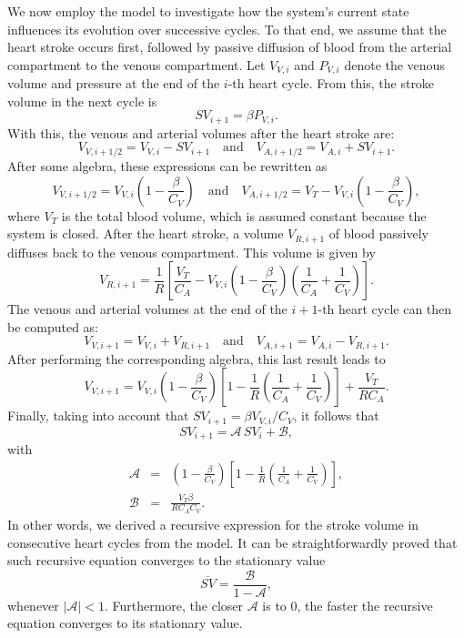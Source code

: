 \documentclass[%
preprint,
 amsmath,amssymb,
 aps,
]{revtex4-2}
\begin{document}
We now employ the \citeauthor{Upton_2005} model to investigate how the system's current state influences its evolution over successive cycles. To that end, we assume that the heart stroke occurs first, followed by passive diffusion of blood from the arterial compartment to the venous compartment. Let $V_{V,i}$ and $P_{V,i}$ denote the venous volume and pressure at the end of the $i$-th heart cycle. From this, the stroke volume in the next cycle is
\[
    SV_{i+1} = \beta P_{V,i}. 
\]
With this, the venous and arterial volumes after the heart stroke are:
\[
    V_{V, i+1/2} = V_{V, i} - SV_{i+1} \quad \text{and} \quad V_{A, i+1/2} = V_{A, i} + SV_{i+1}.
\]
After some algebra, these expressions can be rewritten as
\[
    V_{V, i+1/2} = V_{V,i} \left( 1 - \frac{\beta}{C_V} \right) \quad \text{and} \quad V_{A, i+1/2} = V_T - V_{V,i} \left( 1 - \frac{\beta}{C_V} \right),
\]
where $V_T$ is the total blood volume, which is assumed constant because the system is closed. After the heart stroke, a volume $V_{R, i+1}$ of blood passively diffuses back to the venous compartment. This volume is given by
\[
    V_{R, i+1} = \frac{1}{R}\left[ \frac{V_T}{C_A} - V_{V,i}\left(1-\frac{\beta}{C_V}\right)\left(\frac{1}{C_A} + \frac{1}{C_V}\right)\right].
\]
The venous and arterial volumes at the end of the $i+1$-th heart cycle can then be computed as:
\[
    V_{V, i+1} = V_{V,i} + V_{R, i+1} \quad \text{and} \quad V_{A, i+1} = V_{A,i} - V_{R, i+1}.
\] 
After performing the corresponding algebra, this last result leads to
\[
    V_{V, i+1} = V_{V,i} \left(1-\frac{\beta}{C_V}\right)\left[ 1 -\frac{1}{R}\left(\frac{1}{C_A} + \frac{1}{C_V}\right)\right] + \frac{V_T}{R C_A}.
\]
Finally, taking into account that $SV_{i+1} = \beta V_{V,i} / C_V$, it  follows that
\[
    SV_{i+1} = \mathcal{A} \, SV_{i}  + \mathcal{B},
\]
with
\begin{eqnarray*}
    \mathcal{A} & = & \left(1-\frac{\beta}{C_V}\right)\left[ 1 -\frac{1}{R}\left(\frac{1}{C_A} + \frac{1}{C_V}\right)\right], \\
    \mathcal{B} & = & \frac{V_T \beta}{R C_A C_V}.
\end{eqnarray*}
In other words, we derived a recursive expression for the stroke volume in consecutive heart cycles from the \citet{Upton_2005} model. It can be straightforwardly proved that such recursive equation converges to the stationary value
\[
    \overline{SV} = \frac{\mathcal{B}}{1 - \mathcal{A}},
\]
whenever $|\mathcal{A}| < 1$. Furthermore, the closer $\mathcal{A}$ is to 0, the faster the recursive equation converges to its stationary value.
\end{document}
